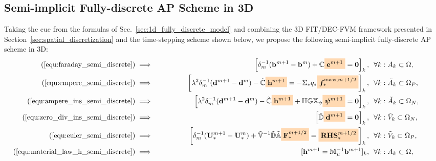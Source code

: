 \documentclass{article}
\newcommand{\mycolorbox}[2]{\colorbox{#1}{$\displaystyle#2$}}
\begin{document}
\subsection{Semi-implicit Fully-discrete AP Scheme in 3D} \label{sec:3d_ap_scheme}

Taking the cue from the formulas of Sec.~\ref{sec:1d_fully_discrete_model} and combining the
3D FIT/DEC-FVM framework presented in Section~\ref{sec:spatial_discretization} and the
time-stepping scheme shown below, we propose the following semi-implicit fully-discrete AP
scheme in 3D:
\begin{subequations}
\begin{align}
    (\ref{equ:faraday_semi_discrete}) &\implies \;\;\;\;\;\;\;\;\;\;\;\;\;\; &
    \left[\delta_m^{-1} (\mathbf{b}^{m+1} - \mathbf{b}^{m}) + \mathbb{C}\mycolorbox{orange!30}{\mathbf{e}^{m+1}} = \mathbf{0} \right]_k,\ \ &\forall k:A_k \subset \Omega, \;\;\;\;\;\;\;\;\;\;\;\label{equ:maxwell_faraday_ap}\\
    (\ref{equ:empere_semi_discrete}) &\implies &
    \left[\lambda^2\delta_m^{-1}(\mathbf{d}^{m+1} - \mathbf{d}^m)- \Tilde{\mathbb{C}}\mycolorbox{orange!30}{\mathbf{h}^{m+1}} = - \Sigma_\ast q_\ast \mycolorbox{orange!30}{\bm{f}^{\text{mass},m+1/2}_{\ast}}\right]_k,\ \ &\forall k:\Tilde{A}_k\subset\Omega_P, \label{equ:maxwell_ampere_plasma_ap}\\
    (\ref{equ:ampere_ins_semi_discrete}) &\implies &
    \left[\lambda^2\delta_m^{-1}(\mathbf{d}^{m+1} - \mathbf{d}^m)- \Tilde{\mathbb{C}}\mycolorbox{orange!30}{\mathbf{h}^{m+1}} + \mathbb{H}\mathbb{GX}_\psi\mycolorbox{orange!30}{\bm{\psi}^{m+1}} = \mathbf{0} \right]_k,\ \ &\forall k:\Tilde{A}_k\subset\Omega_N, \label{equ:maxwell_ampere_nonconducting_ap}\\
    (\ref{equ:zero_div_ins_semi_discrete}) &\implies &
    \left[\Tilde{\mathbb{D}}\mycolorbox{orange!30}{\mathbf{d}^{m+1}} = \mathbf{0}\right]_k, \ \ &\forall k : \Tilde{V}_k \subset \Omega_N, \label{equ:gauss_nonconducting_ap} \\
    (\ref{equ:euler_semi_discrete}) &\implies &
    \left[\delta_m^{-1}(\mathbf{U}_{*}^{m+1} - \mathbf{U}_{*}^{m}) + \mathbb{\Tilde{V}}^{-1}\mathbb{\Tilde{D}}\mathbb{\Tilde{A}}\mycolorbox{orange!30}{\mathbf{F}_\ast^{m+1/2}} = \mycolorbox{orange!30}{\mathbf{RHS}_\ast^{m+1/2}} \right]_k,\ \ &\forall k : \Tilde{V}_k \subset \Omega_P, \label{equ:euler_ap}\\
    (\ref{equ:material_law_h_semi_discrete}) &\implies &
    [\mathbf{h}^{m+1} = \mathbb{M}_\mu^{-1}\mathbf{b}^{m+1}]_k, \ \ &\forall k:A_k \subset \Omega, \label{equ:material_law_h_ap}\\

\end{align}
\end{subequations}
\end{document}
